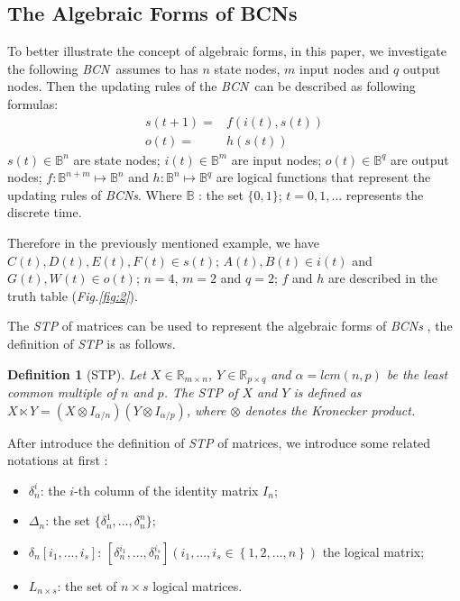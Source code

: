 \documentclass[conference]{IEEEtran} %
\newtheorem{definition}{Definition}
\def \BCN {{\em BCN}}
\begin{document}
\subsection{The Algebraic Forms of BCNs}
To better illustrate the concept of algebraic forms, in this paper, we investigate the following \BCN\ assumes to has $n$ state nodes, $m$ input nodes and $q$ output nodes. Then the updating rules of the \BCN\ can be described as following formulas:
\begin{equation}
\begin{split}
s(t+1)=&f(i(t),s(t))\\
o(t)=&h(s(t))
\end{split}
\label{equ:1}
\end{equation}
$s(t)\in \mathbb{B}^n$ are state nodes; $i(t)\in \mathbb{B}^m$ are input nodes; $o(t)\in \mathbb{B}^q$ are output nodes; $f:\mathbb{B}^{n+m}\mapsto \mathbb{B}^n$ and $h:\mathbb{B}^n\mapsto \mathbb{B}^q$ are logical functions that represent the updating rules of {\em BCNs}. Where $\mathbb{B}$ : the set $\{0,1\}$; $t=0,1,...$ represents the discrete time. 

Therefore in the previously mentioned example, we have $C(t), D(t), E(t), F(t)\in s(t)$; $A(t), B(t)\in i(t)$ and $G(t), W(t)\in o(t)$; $n=4$, $m=2$ and $q=2$; $f$ and $h$ are described in the truth table ({\em Fig.\ref{fig:2}}). 

The {\em STP} of matrices can be used to represent the algebraic forms of {\em BCNs} \cite{cheng2009controllability}, the definition of {\em STP} is as follows.

\begin{definition}[STP] 
	\cite{Cheng2011Analysis} Let $X\in\mathbb{R}_{m\times n}$, $Y\in\mathbb{R}_{p\times q}$ and $\alpha=lcm(n,p)$ be the least common multiple of $n$ and $p$. The STP of $X$ and $Y$ is defined as $X\ltimes Y=(X\otimes I_{\alpha/n})(Y\otimes I_{\alpha/p})$, where $\otimes$ denotes the Kronecker product. 
\end{definition}

After introduce the definition of {\em STP} of matrices,  we introduce some related notations at first \cite{Zhang2016Observability}:
\begin{itemize}
  \item $\delta^i_n$: the $i$-th column of the identity matrix $I_n$;
  \item $\Delta_n$: the set $\{\delta^1_n,...,\delta^n_n \}$; 
  \item $\delta_n \left[i_1,...,i_s\right]$: $\left[\delta^{i_1}_n,...,\delta^{i_s}_n\right]\left(i_1,...,i_s\in\left\{1,2,...,n\right\}\right)$ the logical matrix;
  \item  $L_{n\times s}$: the set of $n\times s$ logical matrices.
\end{itemize}
\end{document}
